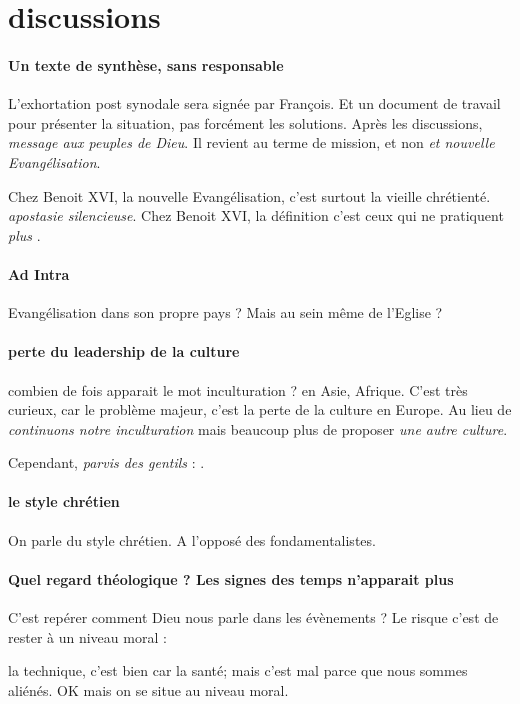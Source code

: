 \section{discussions}

\paragraph{Un texte de synthèse, sans responsable} L'exhortation post synodale sera signée par François.  Et un document de travail pour présenter la situation, pas forcément les solutions. Après les discussions, \textit{message aux peuples de Dieu}. Il revient au terme de mission, et non \textit{et nouvelle Evangélisation}.

Chez Benoit XVI, la nouvelle Evangélisation, c'est surtout la vieille chrétienté. \textit{apostasie silencieuse}. Chez Benoit XVI, la définition c'est ceux qui ne pratiquent \textit{plus} . 

\paragraph{Ad Intra} Evangélisation dans son propre pays ? Mais au sein même de l'Eglise ?

\paragraph{perte du leadership de la culture} combien de fois apparait le mot inculturation ? en Asie, Afrique. C'est très curieux, car le problème majeur, c'est la perte de la culture en Europe. Au lieu de \textit{continuons notre inculturation} mais beaucoup plus de proposer \textit{une autre culture}. 

Cependant, \textit{parvis des gentils} : \cite{ravasi_parvis_2012}.


\paragraph{le style chrétien}
On parle du style chrétien. A l'opposé des fondamentalistes. 


\paragraph{Quel regard théologique ? Les signes des temps n'apparait plus} C'est repérer comment Dieu nous parle dans les évènements ?
Le risque c'est de rester à un niveau moral : 
\begin{Ex}
    la technique, c'est bien car la santé; mais c'est mal parce que nous sommes aliénés. OK mais on se situe au niveau moral.
\end{Ex}

